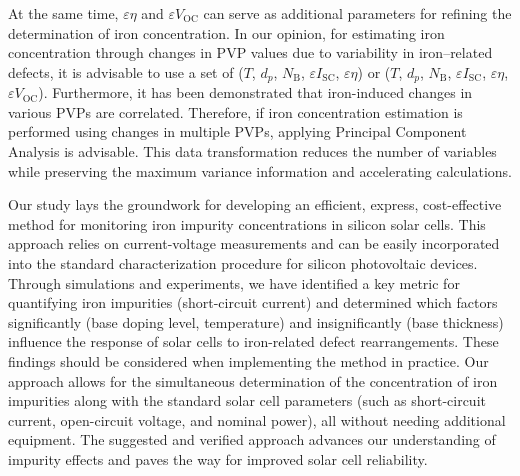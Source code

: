 \documentclass[a4paper,fleqn]{cas-sc}
\begin{document}
\begin{mdframed}
At the same time, $\varepsilon \eta$ and $\varepsilon V_\mathrm{OC}$ can serve as additional parameters
for refining the determination of iron concentration.
In our opinion, for estimating iron concentration through changes
in PVP values due to variability in iron--related defects, it is advisable to use a set of
($T$, $d_p$, $N_\mathrm{B}$, $\varepsilon I_\mathrm{SC}$, $\varepsilon \eta$) or ($T$, $d_p$, $N_\mathrm{B}$, $\varepsilon I_\mathrm{SC}$, $\varepsilon \eta$,$\varepsilon V_\mathrm{OC}$).
\textcolor[rgb]{1.00,0.07,0.00}{Furthermore, it has been demonstrated that iron-induced changes in various PVPs are correlated.
Therefore, if iron concentration estimation is performed using changes
in multiple PVPs, applying Principal Component Analysis is advisable.
This data transformation reduces the number of variables while preserving the maximum variance information and accelerating calculations.}

\textcolor[rgb]{1.00,0.07,0.00}{Our study lays the groundwork for developing an efficient, express, cost-effective method for monitoring iron impurity concentrations in silicon solar cells.
This approach relies on current-voltage measurements and can be easily incorporated into the standard characterization procedure for silicon photovoltaic devices.
Through simulations and experiments, we have identified a key metric for quantifying iron impurities (short-circuit current) and determined which factors significantly (base doping level, temperature) and insignificantly (base thickness) influence the response of solar cells to iron-related defect rearrangements.
These findings should be considered when implementing the method in practice.
Our approach allows for the simultaneous determination of the concentration of iron impurities along with the standard solar cell parameters (such as short-circuit current, open-circuit voltage, and nominal power), all without needing additional equipment.
The suggested and verified approach advances our understanding of impurity effects and paves the way for improved solar cell reliability.}
\end{mdframed}




\end{document}
